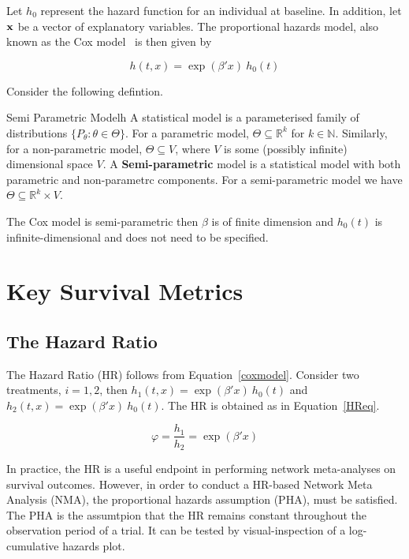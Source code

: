 Let $h_0$ represent the hazard function for an individual at baseline. In addition, let $\bf{x}$ be a vector of explanatory variables. The proportional hazards model, also known as the Cox model~\cite{cox1972} is then given by 

\begin{equation}
    h(t, x) = \exp(\beta'x) \ h_0(t)
    \label{coxmodel}
\end{equation}

Consider the following defintion.

\begin{definition}{Semi Parametric Model}{h}
    A statistical model is a parameterised family of distributions $\{P_{\theta} : \theta \in \Theta\}$. 
    For a parametric model, $\Theta \subseteq \mathbb{R}^k$ for $k \in \mathbb{N}$. Similarly, for a non-parametric model, $\Theta \subseteq V$, where $V$ is some (possibly infinite) dimensional space $V$. A \textbf{Semi-parametric} model is a statistical model with both parametric and non-parametrc components. For a semi-parametric model we have $\Theta \subseteq \mathbb{R}^k \times V$.
\end{definition}

The Cox model is semi-parametric then $\beta$ is of finite dimension and $h_0(t)$ is infinite-dimensional and does not need to be specified. 

\section{Key Survival Metrics}

\subsection{The Hazard Ratio}
The Hazard Ratio (HR) follows from Equation~\ref{coxmodel}. Consider two treatments, $i = 1, 2$, then $h_1(t, x) = \exp(\beta'x) \ h_0(t)$ and $h_2(t, x) = \exp(\beta'x) \ h_0(t)$. The HR is obtained as in Equation~\ref{HReq}.

\begin{equation}
    \varphi = \frac{h_1}{h_2} = \exp(\beta' x)
    \label{HReq}
\end{equation}

In practice, the HR is a useful endpoint in performing network meta-analyses on survival outcomes. However, in order to conduct a HR-based Network Meta Analysis (NMA), the proportional hazards assumption (PHA), must be satisfied. The PHA is the assumtpion that the HR remains constant throughout the observation period of a trial. It can be tested by visual-inspection of a log-cumulative hazards plot. 

